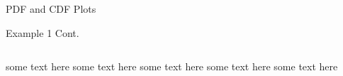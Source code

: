 \documentclass[10pt]{beamer}
\newcommand{\themename}{\textbf{\textsc{metropolis}}\xspace}
\begin{document}
\begin{frame}[fragile]{PDF and CDF Plots}
\begin{exampleblock}{Example 1 Cont.}
\begin{columns}
\begin{column}{0.5\textwidth}
   some text here some text here some text here some text here some text here
\end{column}
\begin{column}{0.5\textwidth}
    \begin{center}
     \end{center}
\end{column}
\end{columns}
\end{exampleblock}
\end{frame}

























\end{document}
